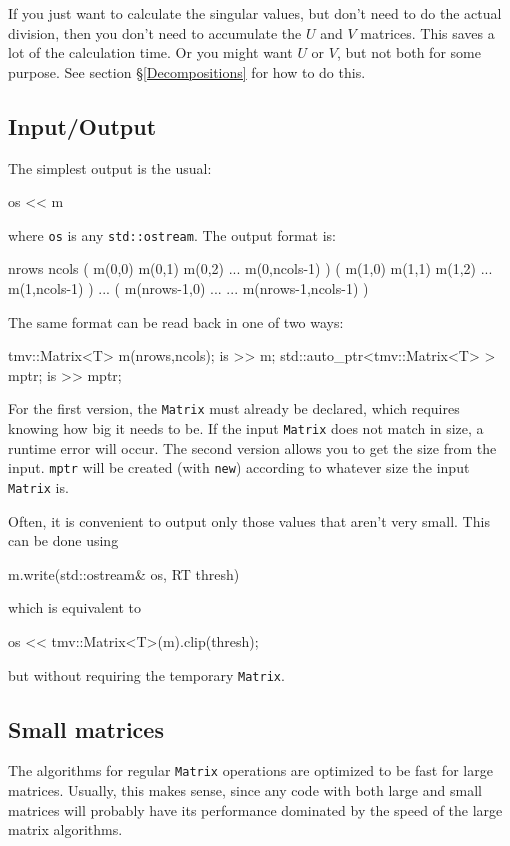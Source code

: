 \documentclass[twoside,letterpaper,11pt]{article}
\renewcommand{\tt}[1]{{\lstinline {#1}}}
\begin{document}
If you just want to calculate the singular values,
but don't need to do the actual division, then you don't need to 
accumulate the $U$ and $V$ matrices.  This saves a lot of the 
calculation time.  Or you might want $U$ or $V$, but not both for 
some purpose.  See section \S\ref{Decompositions} for how to do this.

\subsection{Input/Output}
\label{Matrix_IO}

The simplest output is the usual:
\begin{tmvcode}
os << m
\end{tmvcode}
where \tt{os} is any \tt{std::ostream}.
The output format is:
\begin{tmvcode}
nrows ncols
( m(0,0)  m(0,1)  m(0,2)  ...  m(0,ncols-1) )
( m(1,0)  m(1,1)  m(1,2)  ...  m(1,ncols-1) )
...
( m(nrows-1,0) ...  ...  m(nrows-1,ncols-1) )
\end{tmvcode}

The same format can be read back in one of two ways:
\begin{tmvcode}
tmv::Matrix<T> m(nrows,ncols);
is >> m;
std::auto_ptr<tmv::Matrix<T> > mptr;
is >> mptr;
\end{tmvcode}
For the first version, the \tt{Matrix} must already be declared, which 
requires knowing how big it needs to be.  If the input \tt{Matrix} does not
match in size, a runtime error will occur.
The second version allows you to get the size from the input.  \tt{mptr}
will be created (with \tt{new}) 
according to whatever size the input \tt{Matrix} is.

Often, it is convenient to output only those values that aren't very small. 
This can be done using
\begin{tmvcode}
m.write(std::ostream& os, RT thresh)
\end{tmvcode}
which is equivalent to
\begin{tmvcode}
os << tmv::Matrix<T>(m).clip(thresh);
\end{tmvcode}
but without requiring the temporary \tt{Matrix}.

\subsection{Small matrices}
\label{SmallMatrix}

The algorithms for regular \tt{Matrix} operations are optimized to be
fast for large matrices.  Usually, this makes sense, since any code with
both large and small matrices will probably have its performance dominated
by the speed of the large matrix algorithms.
\end{document}
